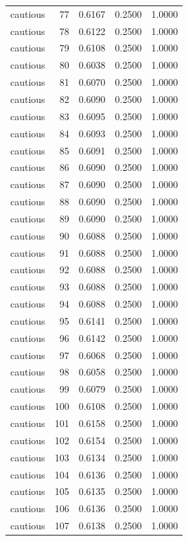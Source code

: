 \begin{tabular}{lrrrr}
cautious & 77 & 0.6167 & 0.2500 & 1.0000 \\
cautious & 78 & 0.6122 & 0.2500 & 1.0000 \\
cautious & 79 & 0.6108 & 0.2500 & 1.0000 \\
cautious & 80 & 0.6038 & 0.2500 & 1.0000 \\
cautious & 81 & 0.6070 & 0.2500 & 1.0000 \\
cautious & 82 & 0.6090 & 0.2500 & 1.0000 \\
cautious & 83 & 0.6095 & 0.2500 & 1.0000 \\
cautious & 84 & 0.6093 & 0.2500 & 1.0000 \\
cautious & 85 & 0.6091 & 0.2500 & 1.0000 \\
cautious & 86 & 0.6090 & 0.2500 & 1.0000 \\
cautious & 87 & 0.6090 & 0.2500 & 1.0000 \\
cautious & 88 & 0.6090 & 0.2500 & 1.0000 \\
cautious & 89 & 0.6090 & 0.2500 & 1.0000 \\
cautious & 90 & 0.6088 & 0.2500 & 1.0000 \\
cautious & 91 & 0.6088 & 0.2500 & 1.0000 \\
cautious & 92 & 0.6088 & 0.2500 & 1.0000 \\
cautious & 93 & 0.6088 & 0.2500 & 1.0000 \\
cautious & 94 & 0.6088 & 0.2500 & 1.0000 \\
cautious & 95 & 0.6141 & 0.2500 & 1.0000 \\
cautious & 96 & 0.6142 & 0.2500 & 1.0000 \\
cautious & 97 & 0.6068 & 0.2500 & 1.0000 \\
cautious & 98 & 0.6058 & 0.2500 & 1.0000 \\
cautious & 99 & 0.6079 & 0.2500 & 1.0000 \\
cautious & 100 & 0.6108 & 0.2500 & 1.0000 \\
cautious & 101 & 0.6158 & 0.2500 & 1.0000 \\
cautious & 102 & 0.6154 & 0.2500 & 1.0000 \\
cautious & 103 & 0.6134 & 0.2500 & 1.0000 \\
cautious & 104 & 0.6136 & 0.2500 & 1.0000 \\
cautious & 105 & 0.6135 & 0.2500 & 1.0000 \\
cautious & 106 & 0.6136 & 0.2500 & 1.0000 \\
cautious & 107 & 0.6138 & 0.2500 & 1.0000 \\

\end{tabular}
